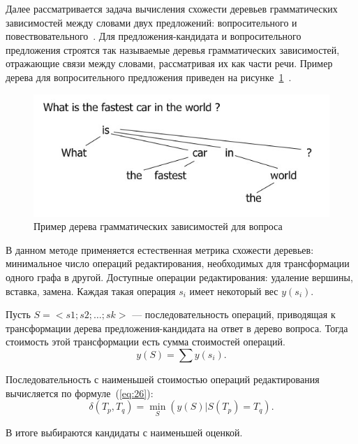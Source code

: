 Далее рассматривается задача вычисления схожести деревьев грамматических зависимостей между словами двух предложений: вопросительного и повествовательного~\cite{step4}. Для предложения-кандидата и вопросительного предложения строятся так называемые деревья грамматических зависимостей, отражающие связи между словами, рассматривая их как части речи. Пример дерева для вопросительного предложения приведен на рисунке~\ref{img:tree}~\cite{trees}. 
\begin{figure}[h!]
	\centering
	\includegraphics[height=0.2\textheight]{img/tree}
	\caption{Пример дерева грамматических зависимостей для вопроса}
	\label{img:tree}
\end{figure}

В данном методе применяется естественная метрика схожести деревьев: минимальное число операций редактирования, необходимых для трансформации одного графа в другой. Доступные операции редактирования: удаление вершины, вставка, замена. Каждая такая операция $s_i$ имеет некоторый вес $y(s_i)$.

Пусть $S = <s1; s2; …; sk>$ --- последовательность операций, приводящая к трансформации дерева предложения-кандидата на ответ в дерево вопроса. Тогда стоимость этой трансформации есть сумма стоимостей операций.
\begin{equation}\label{eq:25}
	y(S) = \sum{y(s_i)}.
\end{equation}

Последовательность с наименьшей стоимостью операций редактирования вычисляется по формуле~(\ref{eq:26}):
\begin{equation}\label{eq:26}
	\delta(T_p, T_q) = \min\limits_{S}(y(S) | S(T_p) = T_q).
\end{equation}

В итоге выбираются кандидаты с наименьшей оценкой.


